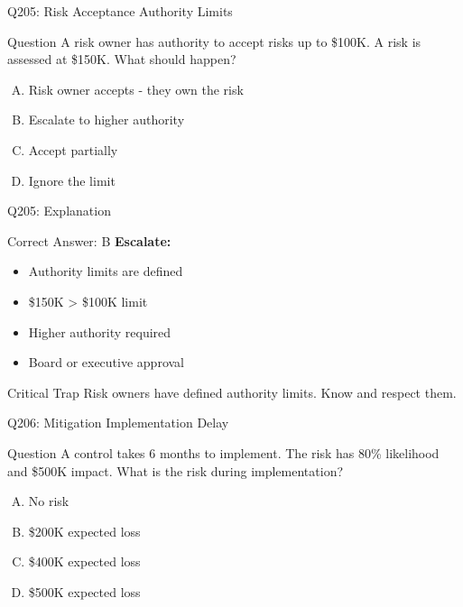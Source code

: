 \documentclass{beamer}
\begin{document}
	\begin{frame}{Q205: Risk Acceptance Authority Limits}
		\begin{block}{Question}
			A risk owner has authority to accept risks up to \$100K. A risk is assessed at \$150K. What should happen?
		\end{block}
		\begin{enumerate}[(A)]
			\item Risk owner accepts - they own the risk
			\item Escalate to higher authority
			\item Accept partially
			\item Ignore the limit
		\end{enumerate}
	\end{frame}
	
	\begin{frame}{Q205: Explanation}
		\begin{block}{Correct Answer: B}
			\textbf{Escalate:}
			\begin{itemize}
				\item Authority limits are defined
				\item \$150K > \$100K limit
				\item Higher authority required
				\item Board or executive approval
			\end{itemize}
		\end{block}
		\begin{alertblock}{Critical Trap}
			Risk owners have defined authority limits.
			Know and respect them.
		\end{alertblock}
	\end{frame}
	
	\begin{frame}{Q206: Mitigation Implementation Delay}
		\begin{block}{Question}
			A control takes 6 months to implement. The risk has 80\% likelihood and \$500K impact. What is the risk during implementation?
		\end{block}
		\begin{enumerate}[(A)]
			\item No risk
			\item \$200K expected loss
			\item \$400K expected loss
			\item \$500K expected loss
		\end{enumerate}
	\end{frame}
	
\end{document}
